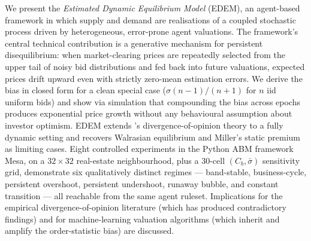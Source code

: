 
We present the \emph{Estimated Dynamic Equilibrium Model} (EDEM), an
agent-based framework in which supply and demand are realisations of
a coupled stochastic process driven by heterogeneous, error-prone
agent valuations. The framework's central technical contribution is
a generative mechanism for persistent disequilibrium: when
market-clearing prices are repeatedly selected from the upper tail
of noisy bid distributions and fed back into future valuations,
expected prices drift upward even with strictly zero-mean estimation
errors. We derive the bias in closed form for a clean special case
($\sigma(n-1)/(n+1)$ for $n$ iid uniform bids) and show via
simulation that compounding the bias across epochs produces
exponential price growth without any behavioural assumption about
investor optimism. EDEM extends \citet{miller1977}'s
divergence-of-opinion theory to a fully dynamic setting and recovers
Walrasian equilibrium and Miller's static premium as limiting cases.
Eight controlled experiments in the Python ABM framework Mesa, on a
$32 \times 32$ real-estate neighbourhood, plus a 30-cell
$(C_{b}, \bar{\sigma})$ sensitivity grid, demonstrate six
qualitatively distinct regimes --- band-stable, business-cycle,
persistent overshoot, persistent undershoot, runaway bubble, and
constant transition --- all reachable from the same agent ruleset.
Implications for the empirical divergence-of-opinion literature
(which has produced contradictory findings) and for machine-learning
valuation algorithms (which inherit and amplify the order-statistic
bias) are discussed.
